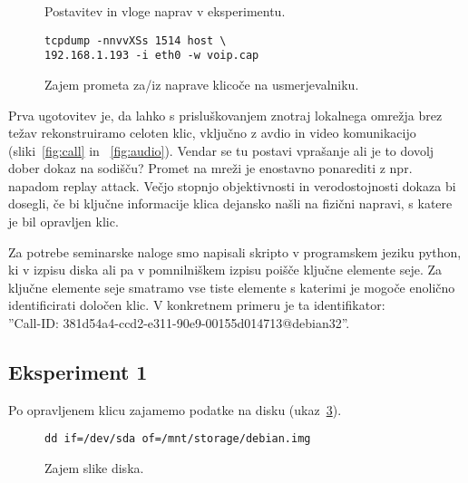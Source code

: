 \documentclass{acm_proc_article-sp}
\begin{document}
\begin{figure}
\centering
{} %
\caption{Postavitev in vloge naprav v eksperimentu.}
\label{fig:setup}
\end{figure}

\begin{figure}
\centering
\begin{verbatim}
tcpdump -nnvvXSs 1514 host \
192.168.1.193 -i eth0 -w voip.cap
\end{verbatim}
\caption{Zajem prometa za/iz naprave klicoče na usmerjevalniku.}
\label{fig:tcpdump}
\end{figure}

Prva ugotovitev je, da lahko s prisluškovanjem znotraj loka\-lnega omrežja brez težav rekonstruiramo celoten klic, vključno z avdio in video komunikacijo (sliki~\ref{fig:call} in ~\ref{fig:audio}). Vendar se tu postavi vprašanje ali je to dovolj dober dokaz na sodišču? Promet na mreži je enostavno ponarediti z npr. napadom replay attack. Večjo stopnjo objektivnosti in verodostojnosti dokaza bi dosegli, če bi ključne informacije klica dejansko našli na fizični napravi, s katere je bil opravljen klic.

\begin{figure*}
\centering
{} %
\caption{Vzpostavitev in potek klica.}
\label{fig:call}
\end{figure*}

\begin{figure*}
\centering
{} %
\caption{Rekonstrukcija zvočnega zapisa s programom wireshark.}
\label{fig:audio}
\end{figure*}

Za potrebe seminarske naloge smo napisali skripto v programskem jeziku python, ki v izpisu diska ali pa v pomnilniškem izpisu poišče ključne elemente seje. Za ključne elemente seje smatramo vse tiste elemente s katerimi je mogoče enolično identificirati določen klic. V konkretnem primeru je ta identifikator:
\\
''Call-ID: 381d54a4-ccd2-e311-90e9-00155d014713@debian32''.

\subsection{Eksperiment 1}

Po opravljenem klicu zajamemo podatke na disku (ukaz~\ref{fig:dd}).
\begin{figure}
\centering
\begin{verbatim}
dd if=/dev/sda of=/mnt/storage/debian.img
\end{verbatim}
\caption{Zajem slike diska.}
\label{fig:dd}
\end{figure}
\end{document}
